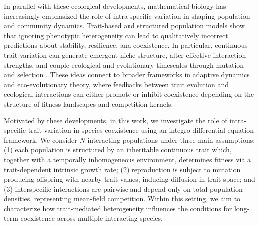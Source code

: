 \documentclass{article}
\begin{document}
In parallel with these ecological developments, mathematical biology has increasingly emphasized the role of intra-specific variation in shaping population and community dynamics. Trait-based and structured population models show that ignoring phenotypic heterogeneity can lead to qualitatively incorrect predictions about stability, resilience, and coexistence. In particular, continuous trait variation can generate emergent niche structure, alter effective interaction strengths, and couple ecological and evolutionary timescales through mutation and selection \cite{des2018ecological}. These ideas connect to broader frameworks in adaptive dynamics and eco-evolutionary theory, where feedbacks between trait evolution and ecological interactions can either promote or inhibit coexistence depending on the structure of fitness landscapes and competition kernels.


Motivated by these developments, in this work, we investigate the role of intra-specific trait variation in species coexistence using an integro-differential equation framework. We consider $N$ interacting populations under three main assumptions: (1) each population is structured by an inheritable continuous trait which, together with a temporally inhomogeneous environment, determines fitness via a trait-dependent intrinsic growth rate; (2) reproduction is subject to mutation producing offspring with nearby trait values, inducing diffusion in trait space; and (3) interspecific interactions are pairwise and depend only on total population densities, representing mean-field competition. Within this setting, we aim to characterize how trait-mediated heterogeneity influences the conditions for long-term coexistence across multiple interacting species.
\end{document}
